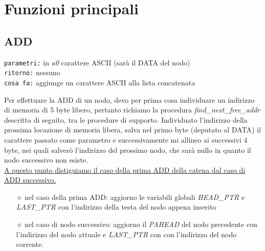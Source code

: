 \documentclass[11pt]{report}
\begin{document}
    \section{Funzioni principali}
    \subsection{ADD}
    \begin{mdframed}
        \texttt{parametri:} in \textit{a0} carattere ASCII (sarà il DATA del nodo) \\
         \texttt{ritorno:} nessuno \\
         \texttt{cosa fa:} aggiunge un carattere ASCII alla lista concatenata
    \end{mdframed}
    Per effettuare la ADD di un nodo, devo per prima cosa individuare un indirizzo di memoria di 5 byte libero, pertanto richiamo la procedura \textit{find\_next\_free\_addr} descritta di seguito, tra le procedure di supporto. Individuato l'indirizzo della prossima locazione di memoria libera, salva nel primo byte (deputato al DATA) il carattere passato come parametro e successivamente mi allineo ai successivi 4 byte, nei quali salverò l'indirizzo del prossimo nodo, che sarà nullo in quanto il nodo successivo non esiste.\\
    \uline{A questo punto distiguiamo il caso della prima ADD della catena dal caso di ADD successivo.}
    \begin{itemize}
        \item[$\diamond$]nel caso della prima ADD: aggiorno le variabili globali \textit{HEAD\_PTR} e \textit{LAST\_PTR} con l'indirizzo della testa del nodo appena inserito
        \item [$\diamond$]nel caso di nodo successivo: aggiorno il \textit{PAHEAD} del nodo precedente con l'indirizzo del nodo attuale e \textit{LAST\_PTR} con con l'indirizzo del nodo corrente.
    \end{itemize}
    \newpage
\end{document}
